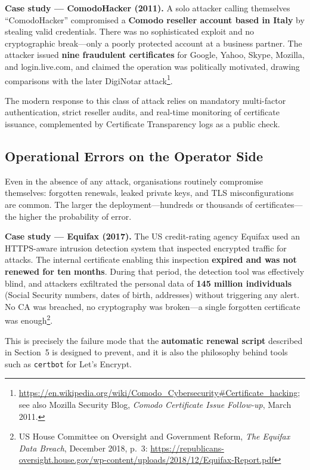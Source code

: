 \documentclass[10pt,twocolumn]{article}
\begin{document}
\textbf{Case study --- ComodoHacker (2011).} A solo attacker calling
themselves ``ComodoHacker'' compromised a \textbf{Comodo reseller account
based in Italy} by stealing valid credentials. There was no sophisticated
exploit and no cryptographic break---only a poorly protected account at a
business partner. The attacker issued \textbf{nine fraudulent certificates}
for Google, Yahoo, Skype, Mozilla, and login.live.com, and claimed the
operation was politically motivated, drawing comparisons with the later
DigiNotar attack\footnote{\url{https://en.wikipedia.org/wiki/Comodo_Cybersecurity\#Certificate_hacking}; see also Mozilla Security Blog, \textit{Comodo Certificate Issue Follow-up}, March 2011.}.

The modern response to this class of attack relies on mandatory multi-factor
authentication, strict reseller audits, and real-time monitoring of
certificate issuance, complemented by Certificate Transparency logs as a
public check.

\subsection{Operational Errors on the Operator Side}

Even in the absence of any attack, organisations routinely compromise
themselves: forgotten renewals, leaked private keys, and TLS
misconfigurations are common. The larger the deployment---hundreds or
thousands of certificates---the higher the probability of error.

\textbf{Case study --- Equifax (2017).} The US credit-rating agency Equifax
used an HTTPS-aware intrusion detection system that inspected encrypted
traffic for attacks. The internal certificate enabling this inspection
\textbf{expired and was not renewed for ten months}. During that period,
the detection tool was effectively blind, and attackers exfiltrated the
personal data of \textbf{145 million individuals} (Social Security numbers,
dates of birth, addresses) without triggering any alert. No CA was
breached, no cryptography was broken---a single forgotten certificate was
enough\footnote{US House Committee on Oversight and Government Reform, \textit{The Equifax Data Breach}, December 2018, p.~3: \url{https://republicans-oversight.house.gov/wp-content/uploads/2018/12/Equifax-Report.pdf}}.

This is precisely the failure mode that the \textbf{automatic renewal
script} described in Section~5 is designed to prevent, and it is also the
philosophy behind tools such as \texttt{certbot} for Let's Encrypt.
\end{document}
